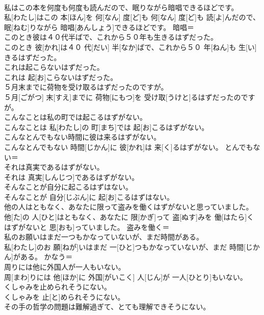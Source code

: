 \documentclass[8pt]{extreport}
\begin{document}
\begin{CJK}{UTF8}{min}
\\	私はこの本を何度も何度も読んだので、眠りながら暗唱できるほどです。	
\\	私[わたし]はこの 本[ほん]を 何[なん] 度[ど]も 何[なん] 度[ど]も 読[よ]んだので、 眠[ねむ]りながら 暗唱[あんしょう]できるほどです。	暗唱＝ 
\\	このとき彼は４０代半ばで、これから５０年も生きるはずだった。	
\\	このとき 彼[かれ]は４０ 代[だい] 半[なか]ばで、これから５０ 年[ねん]も 生[い]きるはずだった。	
\\	これは起こらないはずだった。	
\\	これは 起[お]こらないはずだった。	
\\	５月末までに荷物を受け取るはずだったのですが。	
\\	５月[ごがつ] 末[すえ]までに 荷物[にもつ]を 受け取[うけと]るはずだったのですが。	
\\	こんなことは私の町では起こるはずがない。	
\\	こんなことは 私[わたし]の 町[まち]では 起[お]こるはずがない。	
\\	こんなとんでもない時間に彼は来るはずがない。	
\\	こんなとんでもない 時間[じかん]に 彼[かれ]は 来[く]るはずがない。	とんでもない＝ 
\\	それは真実であるはずがない。	
\\	それは 真実[しんじつ]であるはずがない。	
\\	そんなことが自分に起こるはずはない。	
\\	そんなことが 自分[じぶん]に 起[お]こるはずはない。	
\\	他の人はともなく、あなたに限って盗みを働くはずがないと思っていました。	
\\	他[た]の 人[ひと]はともなく、あなたに 限[かぎ]って 盗[ぬす]みを 働[はたら]くはずがないと 思[おも]っていました。	盗みを働く＝ 
\\	私のお願いはまだ一つもかなっていないが、まだ時間がある。	
\\	私[わたし]のお 願[ねが]いはまだ 一[ひと]つもかなっていないが、まだ 時間[じかん]がある。	かなう＝ 
\\	周りには他に外国人が一人もいない。	
\\	周[まわ]りには 他[ほか]に 外国[がいこく] 人[じん]が 一人[ひとり]もいない。	
\\	くしゃみを止められそうにない。	
\\	くしゃみを 止[と]められそうにない。	
\\	その手の哲学の問題は難解過ぎて、とても理解できそうにない。	

\end{CJK}
\end{document}

